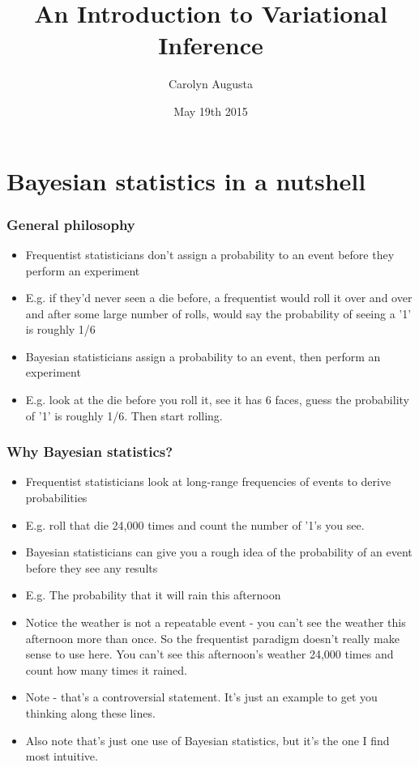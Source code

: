 \documentclass[11pt]{beamer}
\title[Intro to Variational Inference] %
{An Introduction to Variational Inference}
\author[Carolyn Augusta]
{Carolyn Augusta}
\institute[University of Guelph]
{
Department of Mathematics and Statistics\\
University of Guelph\\
}
\date{\small May 19th 2015}
\newcommand{\indentitem}{\setlength\itemindent{25pt} \item}
\newcommand{\zeroindent}{\setlength\itemindent{0pt} \item}
\begin{document}
\def\newblock{\hskip .11em plus .33em minus .07em}

\frame{\titlepage}

\setcounter{tocdepth}{1}

\section{Bayesian statistics in a nutshell}

\frame
{
\frametitle{General philosophy}
	\begin{itemize}
		\item Frequentist statisticians don't assign a probability to an event before they perform an experiment
		\indentitem E.g. if they'd never seen a die before, a frequentist would roll it over and over and after some large number of rolls, would say the probability of seeing a '1' is roughly 1/6
		\zeroindent Bayesian statisticians assign a probability to an event, then perform an experiment
		\indentitem E.g. look at the die before you roll it, see it has 6 faces, guess the probability of '1' is roughly 1/6. Then start rolling.
	\end{itemize}

}

\frame
{
\frametitle{Why Bayesian statistics?}
	\begin{itemize}
		\item Frequentist statisticians look at long-range frequencies of events to derive probabilities
		\indentitem E.g. roll that die 24,000 times and count the number of '1's you see.
		\item Bayesian statisticians can give you a rough idea of the probability of an event before they see any results
		\indentitem E.g. The probability that it will rain this afternoon
		\item Notice the weather is not a repeatable event - you can't see the weather this afternoon more than once. So the frequentist paradigm doesn't really make sense to use here. You can't see this afternoon's weather 24,000 times and count how many times it rained.
		\item Note - that's a controversial statement. It's just an example to get you thinking along these lines.
		\item Also note that's just one use of Bayesian statistics, but it's the one I find most intuitive.
	\end{itemize}
}
\end{document}

